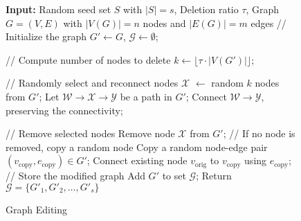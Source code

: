 \begin{figure}[t]
\centering
\begin{minipage}{\columnwidth}
\begin{algorithm}[H]
\small
\caption{Graph Editing}\label{alg:graph_augmentation}
\begin{algorithmic}[1]
\STATE \textbf{Input:} Random seed set $S$ with $|S|=s$,  Deletion ratio $\tau$, Graph $G = (V, E)$ with $|V(G)| = n$ nodes and $|E(G)| = m$ edges
\STATE \textcolor[rgb]{0.5,0.5,0.5}{// Initialize the graph}
\STATE $G' \gets G$, $\mathcal{G} \gets \emptyset$;

\STATE \textcolor[rgb]{0.5,0.5,0.5}{// Compute number of nodes to delete}
\STATE $k \gets \lfloor \tau \cdot |V(G')| \rfloor$;

        \STATE \textcolor[rgb]{0.5,0.5,0.5}{// Randomly select and reconnect nodes}
        \STATE $\mathcal{X}$ $\gets$ random $k$ nodes from $G'$;
        \STATE Let $\mathcal{W} \to \mathcal{X}  \to \mathcal{Y}$ be a path in $G'$;
        \STATE Connect $\mathcal{W} \to \mathcal{Y}$, preserving the connectivity;

        \STATE \textcolor[rgb]{0.5,0.5,0.5}{// Remove selected nodes}
        \STATE Remove node $\mathcal{X}$ from $G'$;
    \ELSE
        \STATE \textcolor[rgb]{0.5,0.5,0.5}{// If no node is removed, copy a random node}\label{alg:add}
        \STATE Copy a random node-edge pair $(v_{\text{copy}}, e_{\text{copy}}) \in G'$;
        \STATE Connect existing node $v_{\text{orig}}$ to $v_{\text{copy}}$ using $e_{\text{copy}}$;
    \ENDIF
    \STATE \textcolor[rgb]{0.5,0.5,0.5}{// Store the modified graph}
    \STATE Add $G'$ to set $\mathcal{G}$;
\ENDFOR
\STATE Return \( \mathcal{G} = \{ G'_1, G'_2, \dots, G'_s \} \)
\end{algorithmic}
\end{algorithm}

\end{minipage}
\end{figure}